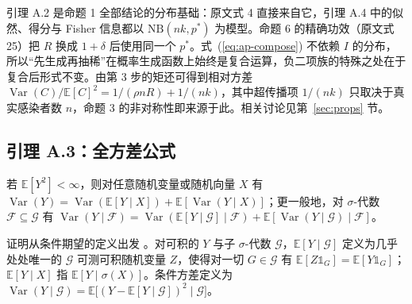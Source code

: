 引理 A.2 是命题 1 全部结论的分布基础：原文式 4 直接来自它，引理 A.4 中的似然、得分与 Fisher 信息都以 $\mathrm{NB}(nk,p^*)$ 为模型。命题 6 的精确功效（原文式 25）把 $R$ 换成 $1+\delta$ 后使用同一个 $p^*$。式~(\ref{eq:ap-compose}) 不依赖 $I$ 的分布，所以“先生成再抽稀”在概率生成函数上始终是复合运算，负二项族的特殊之处在于复合后形式不变。由第 3 步的矩还可得到相对方差 $\operatorname{Var}(C)/\mathbb{E}[C]^2=1/(\rho nR)+1/(nk)$，其中超传播项 $1/(nk)$ 只取决于真实感染者数 $n$，命题 3 的非对称性即来源于此。相关讨论见第~\ref{sec:props} 节。

\subsection{引理 A.3：全方差公式}\label{lem:ap-totvar}

若 $\mathbb{E}[Y^2]<\infty$，则对任意随机变量或随机向量 $X$ 有 $\operatorname{Var}(Y)=\operatorname{Var}(\mathbb{E}[Y\mid X])+\mathbb{E}[\operatorname{Var}(Y\mid X)]$；更一般地，对 $\sigma$-代数 $\mathcal F\subseteq\mathcal G$ 有 $\operatorname{Var}(Y\mid\mathcal F)=\operatorname{Var}(\mathbb{E}[Y\mid\mathcal G]\mid\mathcal F)+\mathbb{E}[\operatorname{Var}(Y\mid\mathcal G)\mid\mathcal F]$。

证明从条件期望的定义出发 \citep{casella2002statistical}。对可积的 $Y$ 与子 $\sigma$-代数 $\mathcal G$，$\mathbb{E}[Y\mid\mathcal G]$ 定义为几乎处处唯一的 $\mathcal G$ 可测可积随机变量 $Z$，使得对一切 $G\in\mathcal G$ 有 $\mathbb{E}[Z\mathbb 1_G]=\mathbb{E}[Y\mathbb 1_G]$；$\mathbb{E}[Y\mid X]$ 指 $\mathbb{E}[Y\mid\sigma(X)]$。条件方差定义为 $\operatorname{Var}(Y\mid\mathcal G)=\mathbb{E}\big[(Y-\mathbb{E}[Y\mid\mathcal G])^2\mid\mathcal G\big]$。

